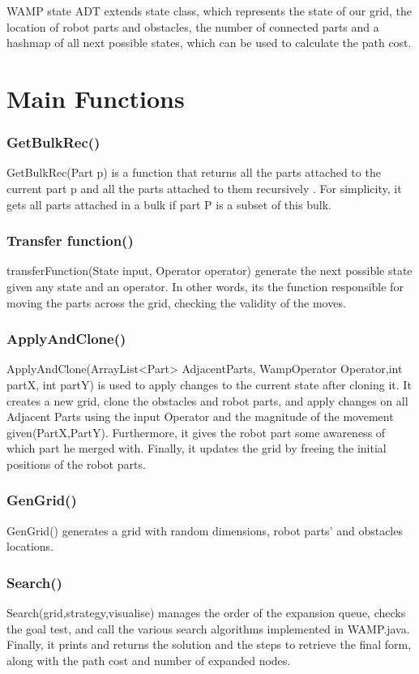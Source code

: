 WAMP state ADT extends state class, which represents the state of our grid, the location of robot parts and obstacles, the number of connected parts and a hashmap of all next possible states, which can be used to calculate the path cost. 
\newpage

\section{Main Functions}
\subsubsection{GetBulkRec()}
GetBulkRec(Part p) is a function that returns all the parts attached to the current part p and all the parts attached to them recursively . For simplicity, it gets all parts attached in a bulk if part P is a subset of this bulk. 



\subsubsection{Transfer function()}
transferFunction(State input, Operator operator) generate the next possible state given any state and an operator. In other words, its the function responsible for moving the parts across the grid, checking the validity of the moves. 

\subsubsection{ApplyAndClone()}
ApplyAndClone(ArrayList<Part> AdjacentParts, WampOperator Operator,int partX, int partY) is used to apply changes to the current state after cloning it. It creates a new grid, clone the obstacles and robot parts, and apply changes on all Adjacent Parts using the input Operator and the magnitude of the movement given(PartX,PartY). Furthermore, it gives the robot part some awareness of which part he merged with. Finally, it updates the grid by freeing the initial positions of the robot parts.

\subsubsection{GenGrid()}
GenGrid() generates a grid with random dimensions, robot parts' and obstacles locations.

\subsubsection{Search()}
Search(grid,strategy,visualise) manages the order of the expansion queue, checks the goal test, and call the various search algorithms implemented in WAMP.java. Finally, it prints and returns the solution and the steps to retrieve the final form, along with the path cost and number of expanded nodes. 


